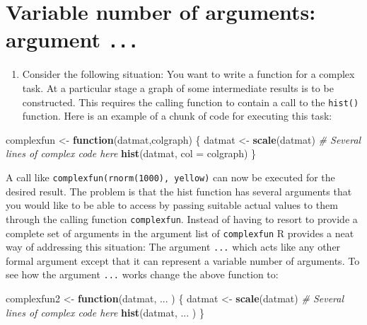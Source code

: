 \documentclass[
]{book}
\newenvironment{Shaded}{\begin{snugshade}}{\end{snugshade}}
\newcommand{\AttributeTok}[1]{\textcolor[rgb]{0.13,0.29,0.53}{#1}}
\newcommand{\CommentTok}[1]{\textcolor[rgb]{0.56,0.35,0.01}{\textit{#1}}}
\newcommand{\ControlFlowTok}[1]{\textcolor[rgb]{0.13,0.29,0.53}{\textbf{#1}}}
\newcommand{\FunctionTok}[1]{\textcolor[rgb]{0.13,0.29,0.53}{\textbf{#1}}}
\newcommand{\NormalTok}[1]{#1}
\newcommand{\OtherTok}[1]{\textcolor[rgb]{0.56,0.35,0.01}{#1}}
\providecommand{\tightlist}{%
  \setlength{\itemsep}{0pt}\setlength{\parskip}{0pt}}
\begin{document}
\section{\texorpdfstring{Variable number of arguments: argument \texttt{...}}{Variable number of arguments: argument ...}}\label{variable-number-of-arguments-argument-...}

\begin{enumerate}
\def\labelenumi{(\alph{enumi})}
\tightlist
\item
  Consider the following situation: You want to write a function for a complex task. At a particular stage a graph of some intermediate results is to be constructed. This requires the calling function to contain a call to the \texttt{hist()} function. Here is an example of a chunk of code for executing this task:
\end{enumerate}

\begin{Shaded}
\begin{Highlighting}[]
\NormalTok{complexfun }\OtherTok{\textless{}{-}} \ControlFlowTok{function}\NormalTok{(datmat,colgraph)}
\NormalTok{    \{ datmat }\OtherTok{\textless{}{-}} \FunctionTok{scale}\NormalTok{(datmat) }
       \CommentTok{\# Several lines of complex code here }
      \FunctionTok{hist}\NormalTok{(datmat, }\AttributeTok{col =}\NormalTok{ colgraph)              \}}
\end{Highlighting}
\end{Shaded}

A call like \texttt{complexfun(rnorm(1000),\ \textquotesingle{}yellow\textquotesingle{})} can now be executed for the desired result. The problem is that the hist function has several arguments that you would like to be able to access by passing suitable actual values to them through the calling function \texttt{complexfun}. Instead of having to resort to provide a complete set of arguments in the argument list of \texttt{complexfun} R provides a neat way of addressing this situation: The argument \texttt{...} which acts like any other formal argument except that it can represent a variable number of arguments. To see how the argument \texttt{...} works change the above function to:

\begin{Shaded}
\begin{Highlighting}[]
\NormalTok{complexfun2 }\OtherTok{\textless{}{-}} \ControlFlowTok{function}\NormalTok{(datmat, ... )}
\NormalTok{ \{ datmat }\OtherTok{\textless{}{-}} \FunctionTok{scale}\NormalTok{(datmat) }
       \CommentTok{\# Several lines of complex code here }
   \FunctionTok{hist}\NormalTok{(datmat, ... )    \}}
\end{Highlighting}
\end{Shaded}
\end{document}
